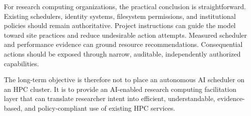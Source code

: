 \documentclass[11pt]{article}
\begin{document}
For research computing organizations, the practical conclusion is straightforward. Existing schedulers, identity systems, filesystem permissions, and institutional policies should remain authoritative. Project instructions can guide the model toward site practices and reduce undesirable action attempts. Measured scheduler and performance evidence can ground resource recommendations. Consequential actions should be exposed through narrow, auditable, independently authorized capabilities.

The long-term objective is therefore not to place an autonomous AI scheduler on an HPC cluster. It is to provide an AI-enabled research computing facilitation layer that can translate researcher intent into efficient, understandable, evidence-based, and policy-compliant use of existing HPC services.
\end{document}
